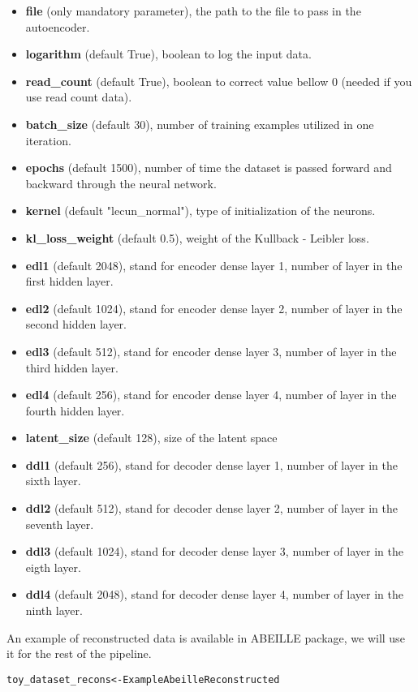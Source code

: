 \documentclass[9pt]{article}\usepackage[]{graphicx}\usepackage[usenames,dvipsnames]{color}
\newcommand{\hlstd}[1]{\textcolor[rgb]{0.251,0.251,0.251}{#1}}%
\newcommand{\hlkwb}[1]{\textcolor[rgb]{0,0,0}{#1}}%
\newenvironment{knitrout}{}{} %
\begin{document}
\begin{itemize}
\item \textbf{file} (only mandatory parameter), the path to the file to pass in the autoencoder.
\item \textbf{logarithm} (default True), boolean to log the input data.
\item \textbf{read\_count} (default True), boolean to correct value bellow 0 (needed if you use read count data).
\item \textbf{batch\_size} (default 30), number of training examples utilized in one iteration.
\item \textbf{epochs} (default 1500), number of time the dataset is passed forward and backward through the neural network.
\item \textbf{kernel} (default "lecun\_normal"), type of initialization of the neurons.
\item \textbf{kl\_loss\_weight} (default 0.5), weight of the Kullback - Leibler loss.
\item \textbf{edl1} (default 2048), stand for encoder dense layer 1, number of layer in the first hidden layer.
\item \textbf{edl2} (default 1024), stand for encoder dense layer 2, number of layer in the second hidden layer.
\item \textbf{edl3} (default 512), stand for encoder dense layer 3, number of layer in the third hidden layer.
\item \textbf{edl4} (default 256), stand for encoder dense layer 4, number of layer in the fourth hidden layer.
\item \textbf{latent\_size} (default 128), size of the latent space
\item \textbf{ddl1} (default 256), stand for decoder dense layer 1, number of layer in the sixth layer.
\item \textbf{ddl2} (default 512), stand for decoder dense layer 2, number of layer in the seventh layer.
\item \textbf{ddl3} (default 1024), stand for decoder dense layer 3, number of layer in the eigth layer.
\item \textbf{ddl4} (default 2048), stand for decoder dense layer 4, number of layer in the ninth layer.

\end{itemize}

An example of reconstructed data is available in ABEILLE package, we will use it for the rest of the pipeline.

\begin{knitrout}
\color{fgcolor}\begin{kframe}
\begin{alltt}
\hlstd{toy_dataset_recons} \hlkwb{<-} \hlstd{ExampleAbeilleReconstructed}
\end{alltt}
\end{kframe}
\end{knitrout}
\end{document}
